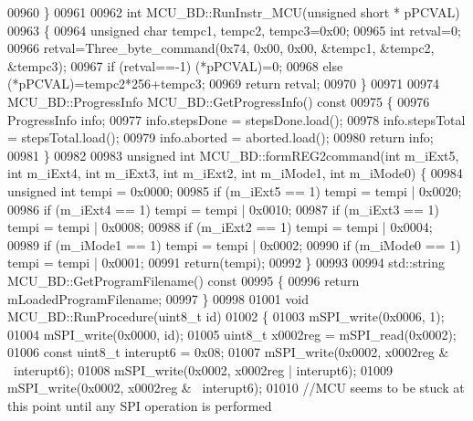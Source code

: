 \begin{DoxyCode}
{{{{{{00960 \}
00961 
00962 \textcolor{keywordtype}{int} MCU\_BD::RunInstr\_MCU(\textcolor{keywordtype}{unsigned} \textcolor{keywordtype}{short} * pPCVAL)
00963 \{
00964     \textcolor{keywordtype}{unsigned} \textcolor{keywordtype}{char} tempc1, tempc2, tempc3=0x00;
00965     \textcolor{keywordtype}{int} retval=0;
00966     retval=Three\_byte\_command(0x74, 0x00, 0x00, &tempc1, &tempc2, &tempc3);
00967     \textcolor{keywordflow}{if} (retval==-1) (*pPCVAL)=0;
00968     \textcolor{keywordflow}{else} (*pPCVAL)=tempc2*256+tempc3;
00969     \textcolor{keywordflow}{return} retval;
00970 \}
00971 
00974 MCU_BD::ProgressInfo MCU\_BD::GetProgressInfo()\textcolor{keyword}{ const}
00975 \textcolor{keyword}{}\{
00976     ProgressInfo info;
00977     info.stepsDone = stepsDone.load();
00978     info.stepsTotal = stepsTotal.load();
00979     info.aborted = aborted.load();
00980     \textcolor{keywordflow}{return} info;
00981 \}
00982 
00983 \textcolor{keywordtype}{unsigned} \textcolor{keywordtype}{int} MCU\_BD::formREG2command(\textcolor{keywordtype}{int} m\_iExt5, \textcolor{keywordtype}{int} m\_iExt4, \textcolor{keywordtype}{int} m\_iExt3, \textcolor{keywordtype}{int} m\_iExt2, \textcolor{keywordtype}{int} m\_iMode1, \textcolor{keywordtype}{int} 
      m\_iMode0) \{
00984     \textcolor{keywordtype}{unsigned} \textcolor{keywordtype}{int} tempi = 0x0000;
00985     \textcolor{keywordflow}{if} (m\_iExt5 == 1)  tempi = tempi | 0x0020;
00986     \textcolor{keywordflow}{if} (m\_iExt4 == 1)  tempi = tempi | 0x0010;
00987     \textcolor{keywordflow}{if} (m\_iExt3 == 1)  tempi = tempi | 0x0008;
00988     \textcolor{keywordflow}{if} (m\_iExt2 == 1)  tempi = tempi | 0x0004;
00989     \textcolor{keywordflow}{if} (m\_iMode1 == 1) tempi = tempi | 0x0002;
00990     \textcolor{keywordflow}{if} (m\_iMode0 == 1) tempi = tempi | 0x0001;
00991     \textcolor{keywordflow}{return}(tempi);
00992 \}
00993 
00994 std::string MCU\_BD::GetProgramFilename()\textcolor{keyword}{ const}
00995 \textcolor{keyword}{}\{
00996     \textcolor{keywordflow}{return} mLoadedProgramFilename;
00997 \}
00998 
01001 \textcolor{keywordtype}{void} MCU\_BD::RunProcedure(uint8\_t \textcolor{keywordtype}{id})
01002 \{
01003     mSPI\_write(0x0006, 1);
01004     mSPI\_write(0x0000, \textcolor{keywordtype}{id});
01005     uint8\_t x0002reg = mSPI\_read(0x0002);
01006     \textcolor{keyword}{const} uint8\_t interupt6 = 0x08;
01007     mSPI\_write(0x0002, x0002reg & ~interupt6);
01008     mSPI\_write(0x0002, x0002reg | interupt6);
01009     mSPI\_write(0x0002, x0002reg & ~interupt6);
01010     \textcolor{comment}{//MCU seems to be stuck at this point until any SPI operation is performed}
}}}}}}
\end{DoxyCode}
